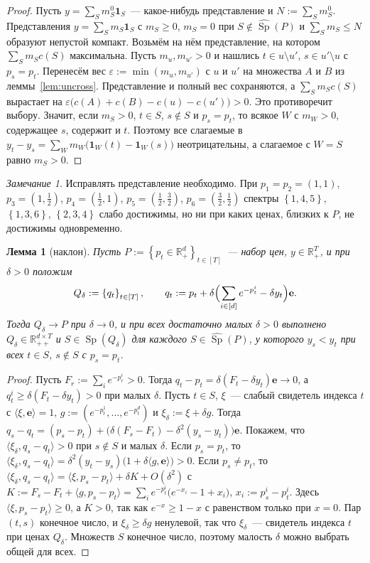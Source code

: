 \documentclass[a4paper,11pt]{article}
\theoremstyle{plain}
\newtheorem{lemma}[theorem]{Лемма}
\theoremstyle{definition}
\theoremstyle{remark}
\newtheorem*{remark}{Замечание}
\newcommand{\R}{\mathbb{R}}
\newcommand{\set}[1]{\left\{ #1 \right\}}
\newcommand{\ip}[2]{\langle #1, #2\rangle} %
\newcommand{\Rpp}[1][2]{\R^{#1}_{++}} %
\newcommand{\Rp}[1][2]{\R^{#1}_{+}}   %
\DeclareMathOperator{\Sp}{Sp}
\begin{document}
\begin{proof}
    Пусть $y=\sum_Sm^0_S\mathbf 1_S$~--- какое-нибудь представление и $N:=\sum_Sm^0_S$. Представления $y=\sum_Sm_S\mathbf 1_S$ с $m_S\ge0$, $m_S=0$ при $S\notin\widehat{\Sp}(P)$ и $\sum_Sm_S\le N$ образуют непустой компакт. Возьмём на нём представление, на котором $\sum_Sm_Sc(S)$ максимальна.
    Пусть $m_u,m_{u'}>0$ и нашлись $t\in u\setminus u'$, $s\in u'\setminus u$ с $p_s=p_t$. Перенесём вес $\varepsilon:=\min(m_u,m_{u'})$ с $u$ и $u'$ на множества $A$ и $B$ из леммы~\ref{lem:uncross}. Представление и полный вес сохраняются, а $\sum_Sm_Sc(S)$ вырастает на $\varepsilon\bigl(c(A)+c(B)-c(u)-c(u')\bigr)>0$. Это противоречит выбору.
    Значит, если $m_S>0$, $t\in S$, $s\notin S$ и $p_s=p_t$, то всякое $W$ с $m_W>0$, содержащее $s$, содержит и $t$. Поэтому все слагаемые в $y_t-y_s=\sum_Wm_W\bigl(\mathbf 1_W(t)-\mathbf 1_W(s)\bigr)$ неотрицательны, а слагаемое с $W=S$ равно $m_S>0$.
\end{proof}

\begin{remark}
    Исправлять представление необходимо. При $p_1=p_2=(1,1)$, $p_3=(1,\tfrac12)$, $p_4=(\tfrac12,1)$, $p_5=(\tfrac12,\tfrac32)$, $p_6=(\tfrac32,\tfrac12)$ спектры $\set{1,4,5}$, $\set{1,3,6}$, $\set{2,3,4}$ слабо достижимы, но ни при каких ценах, близких к $P$, не достижимы одновременно.
\end{remark}

\begin{lemma}[наклон]\label{lem:tilt}
    Пусть $P:=\set{p_t\in\Rp[d]}_{t\in[T]}$~--- набор цен, $y\in\Rp[T]$, и при $\delta>0$ положим
    \[
        Q_\delta:=\set{q_t}_{t\in[T]},\qquad q_t:=p_t+\delta\Bigl(\sum_{i\in[d]}e^{-p^i_t}-\delta y_t\Bigr)\mathbf e.
    \]
    Тогда $Q_\delta\to P$ при $\delta\to0$, и при всех достаточно малых $\delta>0$ выполнено $Q_\delta\in\Rpp[d\times T]$ и $S\in\Sp(Q_\delta)$ для каждого $S\in\widehat{\Sp}(P)$, у которого $y_s<y_t$ при всех $t\in S$, $s\notin S$ с $p_s=p_t$.
\end{lemma}

\begin{proof}
    Пусть $F_r:=\sum_ie^{-p^i_r}>0$. Тогда $q_t-p_t=\delta(F_t-\delta y_t)\mathbf e\to0$, а $q^i_t\ge\delta(F_t-\delta y_t)>0$ при малых $\delta$.
    Пусть $t\in S$, $\xi$~--- слабый свидетель индекса $t$ с $\ip{\xi}{\mathbf e}=1$, $g:=(e^{-p^1_t},\dots,e^{-p^d_t})$ и $\xi_\delta:=\xi+\delta g$. Тогда $q_s-q_t=(p_s-p_t)+\bigl(\delta(F_s-F_t)-\delta^2(y_s-y_t)\bigr)\mathbf e$. Покажем, что $\ip{\xi_\delta}{q_s-q_t}>0$ при $s\notin S$ и малых $\delta$.
    Если $p_s=p_t$, то $\ip{\xi_\delta}{q_s-q_t}=\delta^2(y_t-y_s)\bigl(1+\delta\ip{g}{\mathbf e}\bigr)>0$.
    Если $p_s\ne p_t$, то $\ip{\xi_\delta}{q_s-q_t}=\ip{\xi}{p_s-p_t}+\delta K+O(\delta^2)$ с $K:=F_s-F_t+\ip{g}{p_s-p_t}=\sum_ie^{-p^i_t}\bigl(e^{-x_i}-1+x_i\bigr)$, $x_i:=p^i_s-p^i_t$. Здесь $\ip{\xi}{p_s-p_t}\ge0$, а $K>0$, так как $e^{-x}\ge1-x$ с равенством только при $x=0$.
    Пар $(t,s)$ конечное число, и $\xi_\delta\ge\delta g$ ненулевой, так что $\xi_\delta$~--- свидетель индекса $t$ при ценах $Q_\delta$. Множеств $S$ конечное число, поэтому малость $\delta$ можно выбрать общей для всех.
\end{proof}
\end{document}
